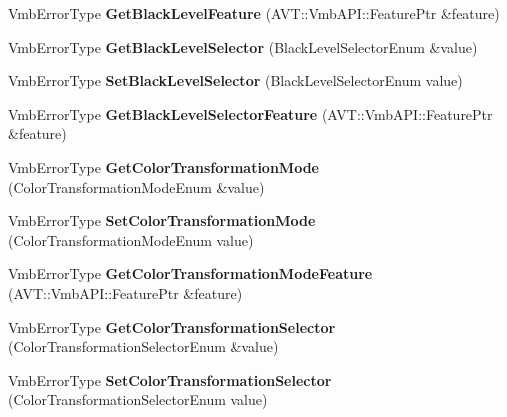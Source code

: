 \begin{DoxyCompactItemize}
\item 
\hypertarget{classMakoCamera_a5c15ec6a871846641db5a88e1bbff9a0}{Vmb\-Error\-Type {\bfseries Get\-Black\-Level\-Feature} (A\-V\-T\-::\-Vmb\-A\-P\-I\-::\-Feature\-Ptr \&feature)}\label{classMakoCamera_a5c15ec6a871846641db5a88e1bbff9a0}

\item 
\hypertarget{classMakoCamera_a38d78f5243087c44d8664b9f4e516374}{Vmb\-Error\-Type {\bfseries Get\-Black\-Level\-Selector} (Black\-Level\-Selector\-Enum \&value)}\label{classMakoCamera_a38d78f5243087c44d8664b9f4e516374}

\item 
\hypertarget{classMakoCamera_a96c91d0365ecdad2c5c110a577f8c27d}{Vmb\-Error\-Type {\bfseries Set\-Black\-Level\-Selector} (Black\-Level\-Selector\-Enum value)}\label{classMakoCamera_a96c91d0365ecdad2c5c110a577f8c27d}

\item 
\hypertarget{classMakoCamera_ab54029fcf0e4d37d2309d0abcf641200}{Vmb\-Error\-Type {\bfseries Get\-Black\-Level\-Selector\-Feature} (A\-V\-T\-::\-Vmb\-A\-P\-I\-::\-Feature\-Ptr \&feature)}\label{classMakoCamera_ab54029fcf0e4d37d2309d0abcf641200}

\item 
\hypertarget{classMakoCamera_a0f1bddd560322a313b32f22439b481f3}{Vmb\-Error\-Type {\bfseries Get\-Color\-Transformation\-Mode} (Color\-Transformation\-Mode\-Enum \&value)}\label{classMakoCamera_a0f1bddd560322a313b32f22439b481f3}

\item 
\hypertarget{classMakoCamera_a256e96c6ae688505bac5cdef7f60fb13}{Vmb\-Error\-Type {\bfseries Set\-Color\-Transformation\-Mode} (Color\-Transformation\-Mode\-Enum value)}\label{classMakoCamera_a256e96c6ae688505bac5cdef7f60fb13}

\item 
\hypertarget{classMakoCamera_a9dca1a28fe49c28b78586e4789df41b9}{Vmb\-Error\-Type {\bfseries Get\-Color\-Transformation\-Mode\-Feature} (A\-V\-T\-::\-Vmb\-A\-P\-I\-::\-Feature\-Ptr \&feature)}\label{classMakoCamera_a9dca1a28fe49c28b78586e4789df41b9}

\item 
\hypertarget{classMakoCamera_aaa6b17efc5f23675cdda430786712aca}{Vmb\-Error\-Type {\bfseries Get\-Color\-Transformation\-Selector} (Color\-Transformation\-Selector\-Enum \&value)}\label{classMakoCamera_aaa6b17efc5f23675cdda430786712aca}

\item 
\hypertarget{classMakoCamera_ad9017389abab1507ced4b125ef2db50a}{Vmb\-Error\-Type {\bfseries Set\-Color\-Transformation\-Selector} (Color\-Transformation\-Selector\-Enum value)}\label{classMakoCamera_ad9017389abab1507ced4b125ef2db50a}


\end{DoxyCompactItemize}
